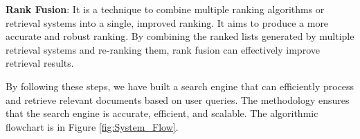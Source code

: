 \noindent \textbf{Rank Fusion}: It is a technique to combine multiple ranking algorithms or retrieval systems into a single, improved ranking. It aims to produce a more accurate and robust ranking. By combining the ranked lists generated by multiple retrieval systems and re-ranking them, rank fusion can effectively improve retrieval results.

\noindent By following these steps, we have built a search engine that can efficiently process and retrieve relevant documents based on user queries. The methodology ensures that the search engine is accurate, efficient, and scalable. The algorithmic flowchart is in Figure \ref{fig:System_Flow}.